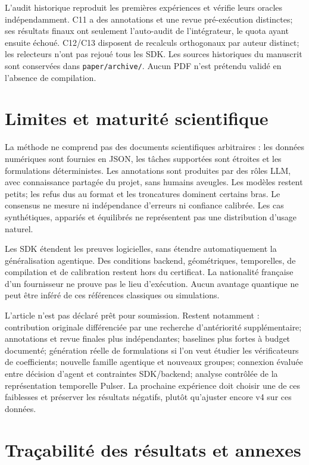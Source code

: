 \documentclass[11pt]{article}
\begin{document}
L'audit historique reproduit les premières expériences et vérifie leurs oracles indépendamment. C11 a des annotations et une revue pré-exécution distinctes; ses résultats finaux ont seulement l'auto-audit de l'intégrateur, le quota ayant ensuite échoué. C12/C13 disposent de recalculs orthogonaux par auteur distinct; les relecteurs n'ont pas rejoué tous les SDK. Les sources historiques du manuscrit sont conservées dans \texttt{paper/archive/}. Aucun PDF n'est prétendu validé en l'absence de compilation.

\section{Limites et maturité scientifique}

La méthode ne comprend pas des documents scientifiques arbitraires : les données numériques sont fournies en JSON, les tâches supportées sont étroites et les formulations déterministes. Les annotations sont produites par des rôles LLM, avec connaissance partagée du projet, sans humains aveugles. Les modèles restent petits; les refus dus au format et les troncatures dominent certains bras. Le consensus ne mesure ni indépendance d'erreurs ni confiance calibrée. Les cas synthétiques, appariés et équilibrés ne représentent pas une distribution d'usage naturel.

Les SDK étendent les preuves logicielles, sans étendre automatiquement la généralisation agentique. Des conditions backend, géométriques, temporelles, de compilation et de calibration restent hors du certificat. La nationalité française d'un fournisseur ne prouve pas le lieu d'exécution. Aucun avantage quantique ne peut être inféré de ces références classiques ou simulations.

L'article n'est pas déclaré prêt pour soumission. Restent notamment : contribution originale différenciée par une recherche d'antériorité supplémentaire; annotations et revue finales plus indépendantes; baselines plus fortes à budget documenté; génération réelle de formulations si l'on veut étudier les vérificateurs de coefficients; nouvelle famille agentique et nouveaux groupes; connexion évaluée entre décision d'agent et contraintes SDK/backend; analyse contrôlée de la représentation temporelle Pulser. La prochaine expérience doit choisir une de ces faiblesses et préserver les résultats négatifs, plutôt qu'ajuster encore v4 sur ces données.

\section{Traçabilité des résultats et annexes}
\end{document}
